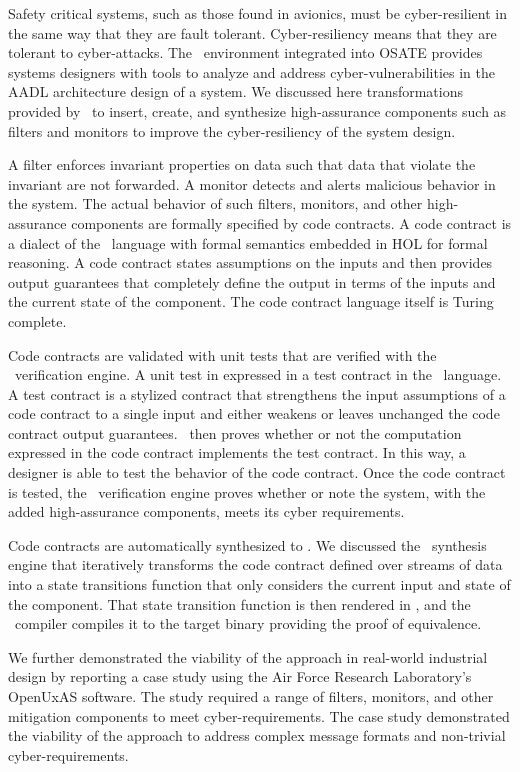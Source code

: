 Safety critical systems, such as those found in avionics, must be cyber-resilient in the same way that they are fault tolerant. 
Cyber-resiliency means that they are tolerant to cyber-attacks.
The \brfcs\ environment integrated into OSATE provides systems designers with tools to analyze and address cyber-vulnerabilities in the AADL architecture design of a system.
We discussed here transformations provided by \brfcs\ to insert, create, and synthesize high-assurance components such as filters and monitors to improve the cyber-resiliency of the system design.

A filter enforces invariant properties on data such that data that violate the invariant are not forwarded.
A monitor detects and alerts malicious behavior in the system. 
The actual behavior of such filters, monitors, and other high-assurance components are formally specified by code contracts.
A code contract is a dialect of the \agr\ language with formal semantics embedded in HOL for formal reasoning.
A code contract states assumptions on the inputs and then provides output guarantees that completely define the output in terms of the inputs and the current state of the component.
The code contract language itself is Turing complete.

Code contracts are validated with unit tests that are verified with the \agr\ verification engine.
A unit test in expressed in a test contract in the \agr\ language.
A test contract is a stylized contract that strengthens the input assumptions of a code contract to a single input and either weakens or leaves unchanged the code contract output guarantees.
\agr\ then proves whether or not the computation expressed in the code contract implements the test contract.
In this way, a designer is able to test the behavior of the code contract.
Once the code contract is tested, the \agr\ verification engine proves whether or note the system, with the added high-assurance components, meets its cyber requirements.

Code contracts are automatically synthesized to \ckml.
We discussed the \splt\ synthesis engine that iteratively transforms the code contract defined over streams of data into a state transitions function that only considers the current input and state of the component.
That state transition function is then rendered in \ckml, and the \ckml\ compiler compiles it to the target binary providing the proof of equivalence.

We further demonstrated the viability of the approach in real-world industrial design by reporting a case study using the Air Force Research Laboratory's OpenUxAS software.
The study required a range of filters, monitors, and other mitigation components to meet cyber-requirements.
The case study demonstrated the viability of the approach to address complex message formats and non-trivial cyber-requirements.

